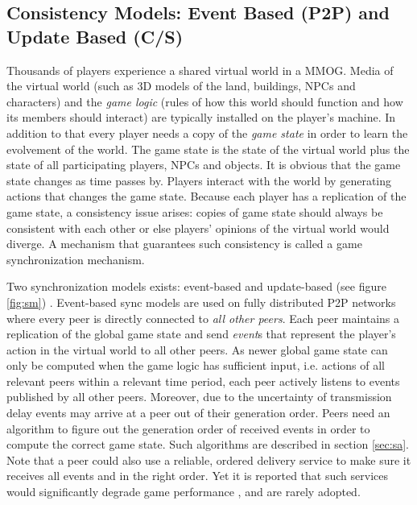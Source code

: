 \documentclass{article}
\begin{document}
\subsection{Consistency Models: Event Based (P2P) and Update Based (C/S)}
\label{sec:cm}
Thousands of players experience a shared virtual world in a MMOG. Media of the virtual world (such as 3D models of the land, buildings, NPCs and characters) and the \emph{game logic} (rules of how this world should function and how its members should interact) are typically installed on the player's machine. In addition to that every player needs a copy of the \emph{game state} in order to learn the evolvement of the world. The game state is the state of the virtual world plus the state of all participating players, NPCs and objects. It is obvious that the game state changes as time passes by. Players interact with the world by generating actions that changes the game state. Because each player has a replication of the game state, a consistency issue arises: copies of game state should always be consistent with each other or else players' opinions of the virtual world would diverge. A mechanism that guarantees such consistency is called a game synchronization mechanism.

Two synchronization models exists: event-based and update-based (see figure \ref{fig:sm}) \cite{Gilmore12}. Event-based sync models are used on fully distributed P2P networks where every peer is directly connected to \emph{all other peers}. Each peer maintains a replication of the global game state and send \emph{event}s that represent the player's action in the virtual world to all other peers. As newer global game state can only be computed when the game logic has sufficient input, i.e. actions of all relevant peers within a relevant time period, each peer actively listens to events published by all other peers. Moreover, due to the uncertainty of transmission delay events may arrive at a peer out of their generation order. Peers need an algorithm to figure out the generation order of received events in order to compute the correct game state. Such algorithms are described in section \ref{sec:sa}. Note that a peer could also use a reliable, ordered delivery service to make sure it receives all events and in the right order. Yet it is reported that such services would significantly degrade game performance \cite{Fgame}, and are rarely adopted. %
\end{document}
